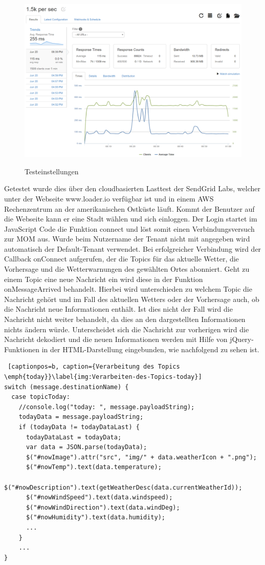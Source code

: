 \begin{figure}[htbp]
	\centering
	\includegraphics[width=1.0\textwidth]{Bilder/Web-TestErgebnisse.png}
	\caption{Testeinstellungen}\cite{webc:3}
	\label{img:testresults}
\end{figure}
\clearpage
Getestet wurde dies über den cloudbasierten Lasttest der SendGrid Labs, welcher unter der Webseite www.loader.io verfügbar ist und in einem AWS Rechenzentrum an der amerikanischen Ostküste läuft. 
Kommt der Benutzer auf die Webseite kann er eine Stadt wählen und sich einloggen. Der Login startet im JavaScript Code die Funktion connect und löst somit einen Verbindungsversuch zur MOM aus. Wurde beim Nutzername der Tenant nicht mit angegeben wird automatisch der Default-Tenant verwendet. Bei erfolgreicher Verbindung wird der Callback onConnect aufgerufen, der die Topics für das aktuelle Wetter, die Vorhersage und die Wetterwarnungen des gewählten Ortes abonniert. Geht zu einem Topic eine neue Nachricht ein wird diese in der Funktion onMessageArrived behandelt. Hierbei wird unterschieden zu welchem Topic die Nachricht gehört und im Fall des aktuellen Wetters oder der Vorhersage auch, ob die Nachricht neue Informationen enthält. Ist dies nicht der Fall wird die Nachricht nicht weiter behandelt, da dies an den dargestellten Informationen nichts ändern würde. Unterscheidet sich die Nachricht zur vorherigen wird die Nachricht dekodiert und die neuen Informationen werden mit Hilfe von jQuery-Funktionen in der HTML-Darstellung eingebunden, wie nachfolgend zu sehen ist. 
\begin{lstlisting} [captionpos=b, caption={Verarbeitung des Topics \emph{today}}\label{img:Verarbeiten-des-Topics-today}]
switch (message.destinationName) {
  case topicToday:
    //console.log("today: ", message.payloadString);
    todayData = message.payloadString;
    if (todayData != todayDataLast) {
      todayDataLast = todayData;
      var data = JSON.parse(todayData);
      $("#nowImage").attr("src", "img/" + data.weatherIcon + ".png");
      $("#nowTemp").text(data.temperature);
      $("#nowDescription").text(getWeatherDesc(data.currentWeatherId));
      $("#nowWindSpeed").text(data.windspeed);
      $("#nowWindDirection").text(data.windDeg);
      $("#nowHumidity").text(data.humidity);
      ...      
    }
    ...
}
\end{lstlisting}

